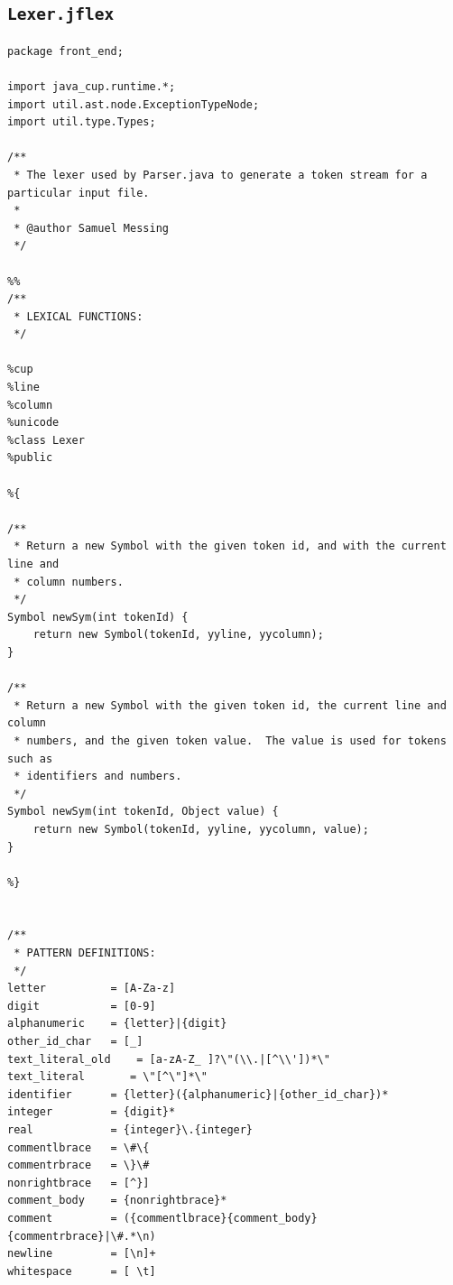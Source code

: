 \documentclass{report}
\begin{document}
\subsection{\texttt{Lexer.jflex}}

\begin{verbatim}
package front_end;

import java_cup.runtime.*;
import util.ast.node.ExceptionTypeNode;
import util.type.Types;

/**
 * The lexer used by Parser.java to generate a token stream for a particular input file.
 *
 * @author Samuel Messing
 */

%%
/**
 * LEXICAL FUNCTIONS:
 */

%cup
%line
%column
%unicode
%class Lexer
%public

%{

/**
 * Return a new Symbol with the given token id, and with the current line and
 * column numbers.
 */
Symbol newSym(int tokenId) {
    return new Symbol(tokenId, yyline, yycolumn);
}

/**
 * Return a new Symbol with the given token id, the current line and column
 * numbers, and the given token value.  The value is used for tokens such as
 * identifiers and numbers.
 */
Symbol newSym(int tokenId, Object value) {
    return new Symbol(tokenId, yyline, yycolumn, value);
}

%}


/**
 * PATTERN DEFINITIONS:
 */
letter          = [A-Za-z]
digit           = [0-9]
alphanumeric    = {letter}|{digit}
other_id_char   = [_]
text_literal_old    = [a-zA-Z_ ]?\"(\\.|[^\\'])*\" 
text_literal       = \"[^\"]*\"
identifier      = {letter}({alphanumeric}|{other_id_char})*
integer         = {digit}*
real            = {integer}\.{integer}
commentlbrace   = \#\{
commentrbrace   = \}\#
nonrightbrace   = [^}]
comment_body    = {nonrightbrace}*
comment         = ({commentlbrace}{comment_body}{commentrbrace}|\#.*\n)
newline         = [\n]+
whitespace      = [ \t]



\end{verbatim}
\end{document}
